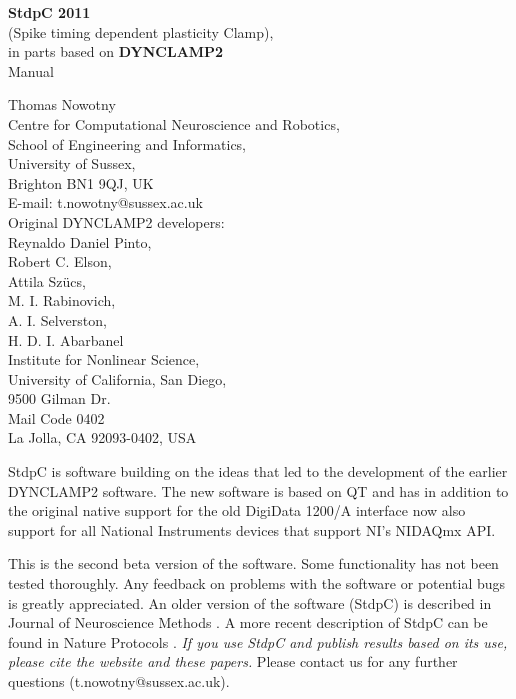 \documentclass{article}
\begin{document}
\begin{titlepage}
  \begin{center}
  {{\bf \Large 
    StdpC 2011 }\\[0.3cm]
    \large (Spike timing dependent plasticity Clamp)}, \\[1cm]
  {\large 
    in parts based on {\bf DYNCLAMP2} \cite{Pinto2001} 
  } \\[2cm]
  {\sc \Large Manual }
  \end{center}
\vspace*{5cm}

\noindent
{\large Thomas Nowotny} \\[0.5cm]
Centre for Computational Neuroscience and Robotics, \\
School of Engineering and Informatics, \\
University of Sussex, \\
Brighton BN1 9QJ, UK \\
E-mail: t.nowotny@sussex.ac.uk
 \\[1cm]
Original DYNCLAMP2 developers: \\[0.2cm]
Reynaldo Daniel Pinto, \\
Robert C. Elson, \\
Attila Sz\"ucs, \\
M. I. Rabinovich, \\
A. I. Selverston,  \\
H. D. I. Abarbanel \\[0.5cm]
Institute for Nonlinear Science, \\
University of California, San Diego, \\
9500 Gilman Dr. \\ Mail Code 0402 \\
La Jolla, CA 92093-0402, USA \\

\end{titlepage}

StdpC is software building on the ideas that led
to the development of the earlier DYNCLAMP2
software. The new software is based on QT and has in addition to the
original native support for the old DigiData 1200/A interface now also
support for all National Instruments devices that support NI's NIDAQmx
API.
 
This is the second beta version of the software. Some functionality has
not been tested thoroughly. Any feedback on problems with the
software or potential bugs is greatly appreciated.  An older version
of the software (StdpC) is described in Journal of Neuroscience
Methods \cite{Nowotny2006}. A more recent description of StdpC can be
found in Nature Protocols \cite{Kemenes2011}. {\em If you use StdpC and publish results
based on its use, please cite the website and these papers.} Please
contact us for any further questions (t.nowotny@sussex.ac.uk).
\end{document}
